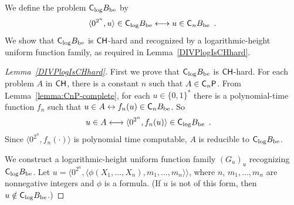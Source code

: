 We define the problem $\mathsf{C}_{\log} B_{\mathrm{be}}$ by
\begin{equation}
\label{equation: definition of padded CQBF}
 \langle 0^{2^n}, u \rangle \in \mathsf{C}_{\log} B_{\mathrm{be}}
 \longleftrightarrow
 u \in \mathsf{C}_n B_{\mathrm{be}} \enspace .
\end{equation}
We show that $\mathsf{C}_{\log} B_{\mathrm{be}}$ 
is $\mathsf{CH}$-hard and recognized by a logarithmic-height uniform function family,
as required in Lemma~\ref{DIVPlogIsCHhard}. 

\begin{proof}[Lemma~\ref{DIVPlogIsCHhard}]
First we prove that $\mathsf{C}_{\log} B_{\mathrm{be}}$ is $\mathsf{CH}$-hard.
For each problem $A$ in $\mathsf{CH}$, there is a constant $n$ such that $A \in \mathsf{C}_n \mathsf{P}$.
From Lemma~\ref{lemma:CnP-complete}, for each $u \in \{0,1\}^*$
there is a polynomial-time function $f_n$ such that
$u \in A \leftrightarrow f_n(u) \in \mathsf{C}_n B_{\mathrm{be}}$. So
\begin{align}
 u \in A 
 & \longleftrightarrow \langle 0^{2^n}, f_n(u) \rangle \in \mathsf{C}_{\log} B_{\mathrm{be}} \enspace .
\end{align}
Since $\langle 0^{2^n}, f_n(\cdot) \rangle$ is polynomial time computable,
$A$ is reducible to $\mathsf{C}_{\log} B_{\mathrm{be}}$.

We construct a logarithmic-height uniform function family $(G_u)_u$
recognizing $\mathsf{C}_{\log} B_{\mathrm{be}}$.
Let $u  = \langle 0^{2^n}, 
\langle \phi(X_1, \dots, X_n), m_1, \dots, m_n \rangle \rangle$, 
where $n$, $m_1, \dots, m_n$ are nonnegative integers 
and $\phi$ is a formula. 
(If $u$ is not of this form, then $u \notin \mathsf{C}_{\log} B_{\mathrm{be}}$.)
 

\end{proof}
